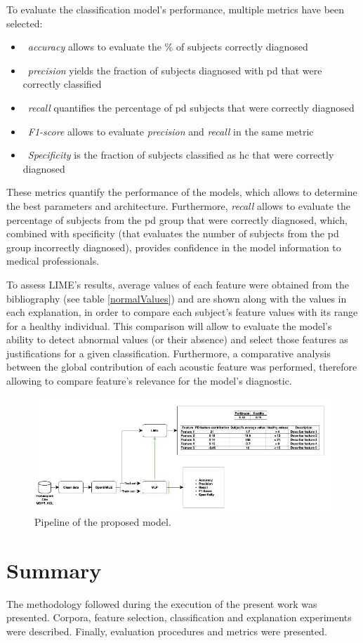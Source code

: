 To evaluate the classification model's performance, multiple metrics have been selected:

\begin{itemize}
	\item ~\textit{accuracy} allows to evaluate the \% of subjects correctly diagnosed
	\item ~\textit{precision}  yields the fraction of subjects diagnosed with \gls{pd} that were correctly classified
	\item ~\textit{recall} quantifies the percentage of \gls{pd} subjects that were correctly diagnosed
	\item ~\textit{F1-score} allows to evaluate \textit{precision} and \textit{recall} in the same metric
	\item ~\textit{Specificity} is the fraction of subjects classified as \gls{hc} that were correctly diagnosed
\end{itemize}

These metrics quantify the performance of the models, which allows to determine the best parameters and architecture. Furthermore, \textit{recall} allows to evaluate the percentage of subjects from the \gls{pd} group that were correctly diagnosed, which, combined with specificity (that evaluates the number of subjects from the \gls{pd} group incorrectly diagnosed), provides confidence in the model information to medical professionals.

To assess LIME's results, average values of each feature were obtained from the bibliography (see table \ref{normalValues}) and are shown along with the values in each explanation, in order to compare each subject's feature values with its range for a healthy individual. This comparison will allow to evaluate the model's ability to detect abnormal values (or their absence) and select those features as justifications for a given classification. Furthermore, a comparative analysis between the global contribution of each acoustic feature was performed, therefore allowing to compare feature's relevance for the model's diagnostic.

\begin{figure}[t]
	\begin{center}
		\includegraphics[clip=true, width=\textwidth]{figs/pipeline.png}
	\end{center}
	\caption{Pipeline of the proposed model.}
	\label{pipeline}
\end{figure}

\section{Summary}

The methodology followed during the execution of the present work was presented. Corpora, feature selection, classification and   explanation experiments were described. Finally, evaluation procedures and metrics were presented.